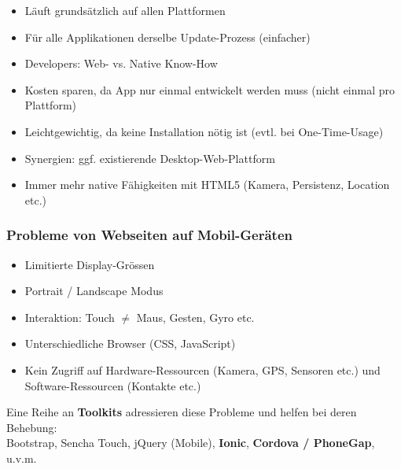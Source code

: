 \documentclass[a4paper]{article}
\begin{document}
		\begin{itemize}
			
			\item Läuft grundsätzlich auf allen Plattformen
			
			\item Für alle Applikationen derselbe Update-Prozess (einfacher)
			
			\item Developers: Web- vs. Native Know-How
			
			\item Kosten sparen, da App nur einmal entwickelt werden muss (nicht einmal pro Plattform)
			
			\item Leichtgewichtig, da keine Installation nötig ist (evtl. bei One-Time-Usage)
			
			\item Synergien: ggf. existierende Desktop-Web-Plattform
			
			\item Immer mehr native Fähigkeiten mit HTML5 (Kamera, Persistenz, Location etc.)
			
		\end{itemize}
	
		\subsubsection{Probleme von Webseiten auf Mobil-Geräten}
		
		\begin{itemize}
			
			\item Limitierte Display-Grössen
			
			\item Portrait / Landscape Modus
			
			\item Interaktion: Touch $\neq$ Maus, Gesten, Gyro etc.
			
			\item Unterschiedliche Browser (CSS, JavaScript)
			
			\item Kein Zugriff auf Hardware-Ressourcen (Kamera, GPS, Sensoren etc.) und Software-Ressourcen (Kontakte etc.)
			
		\end{itemize}
		\vspace{1em}
		Eine Reihe an \textbf{Toolkits} adressieren diese Probleme und helfen bei deren Behebung:\\
		Bootstrap, Sencha Touch, jQuery (Mobile), \textbf{Ionic}, \textbf{Cordova / PhoneGap}, u.v.m.
		
\end{document}
